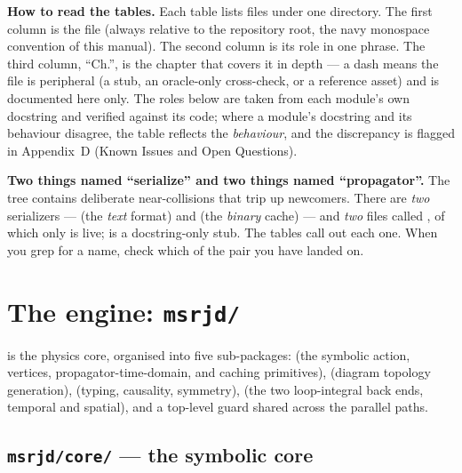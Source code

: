 \begin{note}
\textbf{How to read the tables.} Each table lists files under one
directory. The first column is the file (always relative to the repository
root, the navy monospace convention of this manual). The second column is
its role in one phrase. The third column, ``Ch.'', is the chapter that
covers it in depth --- a dash means the file is peripheral (a stub, an
oracle-only cross-check, or a reference asset) and is documented here only.
The roles below are taken from each module's own docstring and verified
against its code; where a module's docstring and its behaviour disagree,
the table reflects the \emph{behaviour}, and the discrepancy is flagged in
Appendix~D (Known Issues and Open Questions).
\end{note}

\begin{gotcha}
\textbf{Two things named ``serialize'' and two things named
``propagator''.} The tree contains deliberate near-collisions that trip up
newcomers. There are \emph{two} serializers ---
 (the  \emph{text}
format) and  (the  \emph{binary}
cache) --- and \emph{two} files called , of which only
 is live;  is
a docstring-only stub. The tables call out each one. When you grep for a
name, check which of the pair you have landed on.
\end{gotcha}

\section{The engine: \texttt{msrjd/}}

 is the physics core, organised into five sub-packages:
 (the symbolic action, vertices, propagator-time-domain, and
caching primitives),  (diagram topology generation),
 (typing, causality, symmetry),  (the
two loop-integral back ends, temporal and spatial), and a top-level
 guard shared across the parallel paths.

\subsection{\texttt{msrjd/core/} --- the symbolic core}

